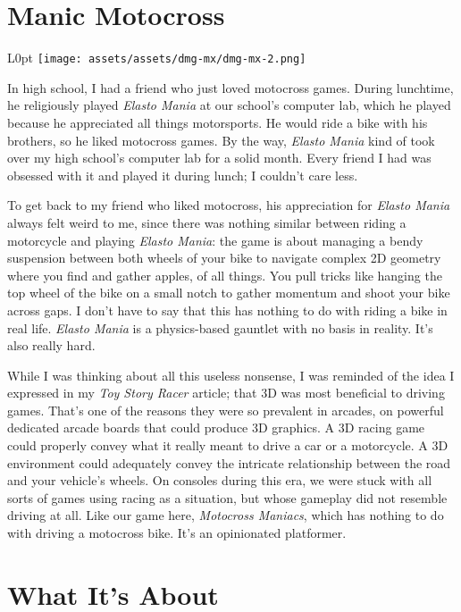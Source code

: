 \documentclass{book}
\begin{document}
\newpage\FloatBarrier\needspace{10mm}\section*{Manic Motocross}\nopagebreak[4]
\begin{wrapfigure}{L}{0pt} \texttt{[image: assets/assets/dmg-mx/dmg-mx-2.png]}\end{wrapfigure}
In high school, I had a friend who just loved motocross games. During lunchtime, he religiously played \emph{Elasto Mania} at our school’s computer lab, which he played because he appreciated all things motorsports. He would ride a bike with his brothers, so he liked motocross games. By the way, \emph{Elasto Mania} kind of took over my high school’s computer lab for a solid month. Every friend I had was obsessed with it and played it during lunch; I couldn’t care less.

To get back to my friend who liked motocross, his appreciation for \emph{Elasto Mania} always felt weird to me, since there was nothing similar between riding a motorcycle and playing \emph{Elasto Mania}: the game is about managing a bendy suspension between both wheels of your bike to navigate complex 2D geometry where you find and gather apples, of all things. You pull tricks like hanging the top wheel of the bike on a small notch to gather momentum and shoot your bike across gaps. I don’t have to say that this has nothing to do with riding a bike in real life. \emph{Elasto Mania} is a physics-based gauntlet with no basis in reality. It’s also really hard.

While I was thinking about all this useless nonsense, I was reminded of the idea I expressed in my \emph{Toy Story Racer} article; that 3D was most beneficial to driving games. That’s one of the reasons they were so prevalent in arcades, on powerful dedicated arcade boards that could produce 3D graphics. A 3D racing game could properly convey what it really meant to drive a car or a motorcycle. A 3D environment could adequately convey the intricate relationship between the road and your vehicle’s wheels. On consoles during this era, we were stuck with all sorts of games using racing as a situation, but whose gameplay did not resemble driving at all. Like our game here, \emph{Motocross Maniacs}, which has nothing to do with driving a motocross bike. It’s an opinionated platformer.

\FloatBarrier\needspace{10mm}\section*{What It’s About}\nopagebreak[4]
\end{document}

